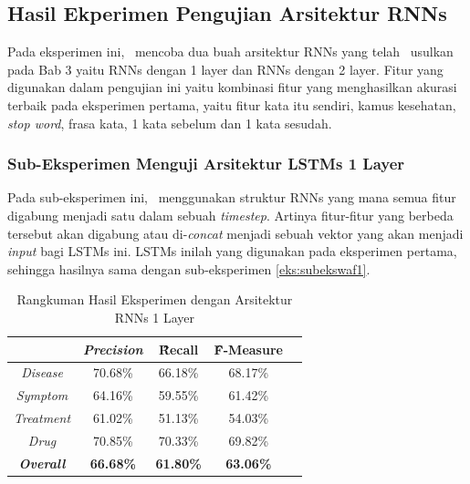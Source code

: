 	
	
  
  
    \subsection{Hasil Ekperimen Pengujian Arsitektur RNNs}\label{eks:eks2}
    
    Pada eksperimen ini, \saya~mencoba dua buah arsitektur RNNs yang telah \saya~usulkan pada Bab 3 yaitu RNNs dengan 1 layer dan RNNs dengan 2 layer. Fitur yang digunakan dalam pengujian ini yaitu kombinasi fitur yang menghasilkan akurasi terbaik pada eksperimen pertama, yaitu fitur kata itu sendiri, kamus kesehatan, \textit{stop word}, frasa kata, 1 kata sebelum dan 1 kata sesudah.
    
    \subsubsection{Sub-Eksperimen Menguji Arsitektur LSTMs 1 Layer}\label{eks2:subeksrnn1}
    Pada sub-eksperimen ini, \saya~menggunakan struktur RNNs yang mana semua fitur digabung menjadi satu dalam sebuah \textit{timestep}.
    Artinya fitur-fitur yang berbeda tersebut akan digabung atau di-\textit{concat} menjadi sebuah vektor yang akan menjadi \textit{input} bagi LSTMs ini. LSTMs inilah yang digunakan pada eksperimen pertama, sehingga hasilnya sama dengan sub-eksperimen \ref{eks:subekswaf1}.
    
    \begin{table}
    	\centering
    	\caption{Rangkuman Hasil Eksperimen dengan Arsitektur RNNs 1 Layer}
    	\begin{tabular}{|c|c|c|c|c|}
    		\hline
    		& \textit{Precision} & \f{\f{Recall}} & \f{\f{F-Measure}} \\ \hline
    		\textit{Disease}      & 70.68\%             & 66.18\%        & 68.17\%           \\ \hline
    		\textit{Symptom}      & 64.16\%             & 59.55\%        & 61.42\%           \\ \hline
    		\textit{Treatment}    & 61.02\%             & 51.13\%        & 54.03\%           \\ \hline
    		\textit{Drug}		  & 70.85\%             & 70.33\%        & 69.82\%           \\ \hline
    		\textit{\textbf{Overall}}&\textbf{66.68\%}  & \textbf{61.80\%}& \textbf{63.06\%} \\ \hline
    	\end{tabular}
    	\label{table:owndict9}
    \end{table}
    
